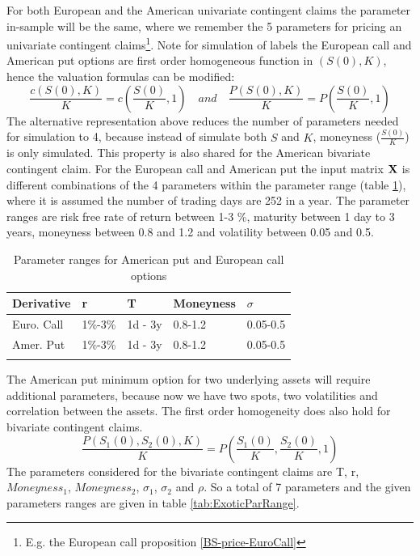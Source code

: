 For both European and the American univariate contingent claims the parameter in-sample will be the same, where we remember the 5 parameters for pricing an  univariate contingent claims\footnote{E.g. the European call proposition \ref{BS-price-EuroCall}}. Note for simulation of labels the European call and American put options are first order homogeneous function in $(S(0),K)$, hence the valuation formulas can be modified:
$$\frac{c(S(0),K)}{K}=c(\frac{S(0)}{K},1) \quad and \quad \frac{P(S(0),K)}{K}=P(\frac{S(0)}{K},1)$$
The alternative representation above reduces the number of parameters needed for simulation to 4, because instead of simulate both $S$ and $K$, moneyness ($\frac{S(0)}{K}$) is only  simulated. This property is also shared for the American bivariate contingent claim. For the European call and American put the input matrix $\mathbf{X}$ is different combinations of the 4 parameters within the parameter range (table \ref{tab:vanillaParRange}), where it is assumed the number of trading days are 252 in a year. The parameter ranges are risk free rate of return between 1-3 \%, maturity between 1 day to 3 years, moneyness between 0.8 and 1.2 and volatility between 0.05 and 0.5. \\

\begin{table}[th]
\caption[Parameter Ranges For MLPs]{Parameter ranges for American put and European call options}
\label{tab:vanillaParRange}
\centering
\begin{tabular}{l l l l l}
\toprule
\textbf{Derivative} & \textbf{r} & \textbf{T} & \textbf{Moneyness} & $\sigma$ \\
\midrule
Euro. Call & 1\%-3\% & 1d - 3y & 0.8-1.2 & 0.05-0.5\\ 
Amer. Put & 1\%-3\% & 1d - 3y & 0.8-1.2 & 0.05-0.5\\ 
\bottomrule\\
\end{tabular}
\end{table}

The American put minimum option for two underlying assets will require additional parameters, because now we have two spots, two volatilities and correlation between the assets. The first order homogeneity does also hold for bivariate contingent claims.
$$\frac{P(S_1(0),S_2(0),K)}{K}=P(\frac{S_1(0)}{K}, \frac{S_2(0)}{K},1)$$
The parameters considered for the bivariate contingent claims are T, r, $Moneyness_1$, $Moneyness_2$, $\sigma_1$, $\sigma_2$ and $\rho$. So a total of 7 parameters and the given parameters ranges are given in table \ref{tab:ExoticParRange}.\\
   
